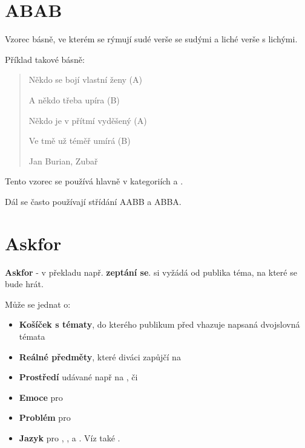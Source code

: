 \documentclass[main.tex]{subfiles}
\begin{document}
\needspace{5cm} \section{ABAB} \label{abab} Vzorec básně, ve kterém se rýmují sudé verše se sudými a liché verše s lichými. 
 
Příklad takové básně: 
	 
\begin{quote} 
Někdo se bojí vlastní ženy (A)

 
A někdo třeba upíra (B)

 
Někdo je v přítmí vyděšený (A)

 
Ve tmě už téměř umírá (B) 
 
Jan Burian, Zubař 
\end{quote} 
 
Tento vzorec se používá hlavně v kategoriích  a . 
 
Dál se často používají střídání AABB a ABBA. 
 
 
 
\needspace{5cm} \section{Askfor} \label{askfor} \textbf{Askfor}{} - v překladu např. \textbf{zeptání se}{}.  si vyžádá od publika téma, na které se bude hrát. 
 
Může se jednat o: 
\begin{itemize}
\item \textbf{Košíček s tématy}{}, do kterého publikum před  vhazuje napsaná dvojslovná témata
\item \textbf{Reálné předměty}{}, které diváci zapůjčí na 
\item \textbf{Prostředí}{} udávané např na ,  či 
\item \textbf{Emoce}{} pro 
\item \textbf{Problém}{} pro 
\item \textbf{Jazyk}{} pro , ,  a . Víz také .
\end{itemize}
 
\end{document}
